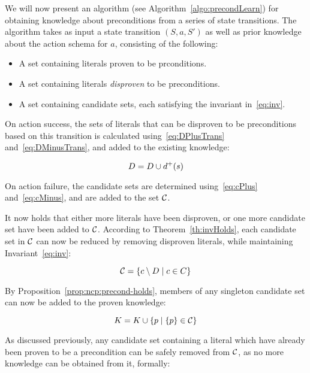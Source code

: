 \documentclass[\master/Master.tex]{subfiles}
\begin{document}
We will now present an algorithm (see Algorithm~\ref{algo:precondLearn}) for obtaining knowledge about preconditions from a series of state transitions. The algorithm takes as input a state transition $(S, a, S')$ as well as prior knowledge about the action schema for $a$, consisting of the following:

\begin{itemize}
    \item A set \Pro containing literals proven to be prconditions.
	\item A set \Dsp containing literals \emph{disproven} to be preconditions.
    \item A set \cset containing candidate sets, each satisfying the invariant in~\eqref{eq:inv}.
\end{itemize}

On action success, the sets of literals that can be disproven to be preconditions based on this transition is calculated using~\eqref{eq:DPlusTrans} and~\eqref{eq:DMinusTrans}, and added to the existing knowledge:

\begin{equation*}
    D = D \cup d^+(s)
\end{equation*}

On action failure, the candidate sets are determined using~\eqref{eq:cPlus} and~\eqref{eq:cMinus}, and are added to the set $\mathcal{C}$.

It now holds that either more literals have been disproven, or one more candidate set have been added to $\mathcal{C}$. According to Theorem~\ref{th:invHolds}, each candidate set in $\mathcal{C}$ can now be reduced by removing disproven literals, while maintaining Invariant~\eqref{eq:inv}:

\begin{equation} \label{reduceCands}
    \mathcal{C} = \left\{ c \setminus D \; | \; c \in C \right\}
\end{equation}

By Proposition~\ref{prop:ncp:precond-holds}, members of any singleton candidate set can now be added to the proven knowledge:

\begin{equation} \label{eq:extractKnown}
    K = K \cup \left\{ p \; | \; \{ p \} \in \mathcal{C} \right\}
\end{equation}

As discussed previously, any candidate set containing a literal which have already been proven to be a precondition can be safely removed from $\mathcal{C}$, as no more knowledge can be obtained from it, formally:
\end{document}
